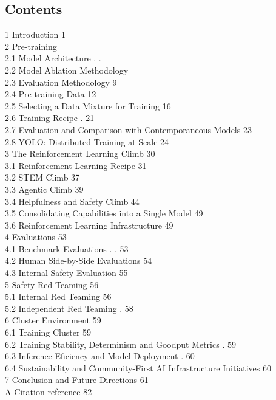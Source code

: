 \subsection{Contents}\label{contents}

1 Introduction 1\\
2 Pre-training\\
2.1 Model Architecture . .\\
2.2 Model Ablation Methodology\\
2.3 Evaluation Methodology 9\\
2.4 Pre-training Data 12\\
2.5 Selecting a Data Mixture for Training 16\\
2.6 Training Recipe . 21\\
2.7 Evaluation and Comparison with Contemporaneous Models 23\\
2.8 YOLO: Distributed Training at Scale 24\\
3 The Reinforcement Learning Climb 30\\
3.1 Reinforcement Learning Recipe 31\\
3.2 STEM Climb 37\\
3.3 Agentic Climb 39\\
3.4 Helpfulness and Safety Climb 44\\
3.5 Consolidating Capabilities into a Single Model 49\\
3.6 Reinforcement Learning Infrastructure 49\\
4 Evaluations 53\\
4.1 Benchmark Evaluations . . 53\\
4.2 Human Side-by-Side Evaluations 54\\
4.3 Internal Safety Evaluation 55\\
5 Safety Red Teaming 56\\
5.1 Internal Red Teaming 56\\
5.2 Independent Red Teaming . 58\\
6 Cluster Environment 59\\
6.1 Training Cluster 59\\
6.2 Training Stability, Determinism and Goodput Metrics . 59\\
6.3 Inference Eficiency and Model Deployment . 60\\
6.4 Sustainability and Community-First AI Infrastructure Initiatives
60\\
7 Conclusion and Future Directions 61\\
A Citation reference 82\\
